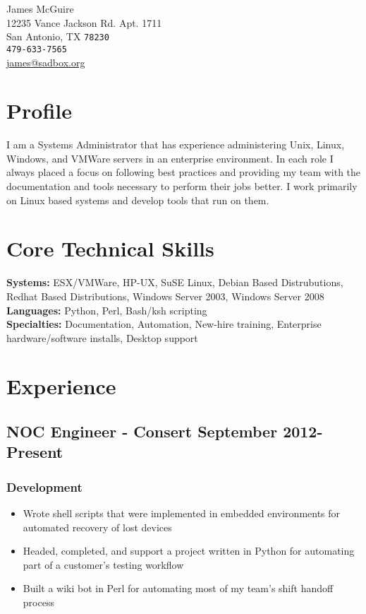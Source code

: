 \documentclass[10pt]{article}
\begin{document}
{\LARGE James McGuire}\\[0.5cm]
12235 Vance Jackson Rd. Apt. 1711\\
San Antonio, TX \texttt{78230}\\[.2cm]
\texttt{479-633-7565}\\
\href{mailto:james@sadbox.org}{james@sadbox.org}\\

\section*{Profile}
I am a Systems Administrator that has experience administering Unix, Linux, Windows, and VMWare servers in an enterprise environment. In each role I always placed a focus on following best practices and providing my team with the documentation and tools necessary to perform their jobs better. I work primarily on Linux based systems and develop tools that run on them.

\section*{Core Technical Skills}
\textbf{Systems:} ESX/VMWare, HP-UX, SuSE Linux, Debian Based Distrubutions, Redhat Based Distributions, Windows Server 2003, Windows Server 2008 \\
\textbf{Languages:} Python, Perl, Bash/ksh scripting \\
\textbf{Specialties:} Documentation, Automation, New-hire training, Enterprise hardware/software installs, Desktop support \\

\section*{Experience}
\subsection*{NOC Engineer - Consert \hfill September 2012-Present}
\subsubsection*{Development}
\begin{itemize}
    \item Wrote shell scripts that were implemented in embedded environments for automated recovery of lost devices
    \item Headed, completed, and support a project written in Python for automating part of a customer's testing workflow
    \item Built a wiki bot in Perl for automating most of my team's shift handoff process
\end{itemize}
\end{document}
